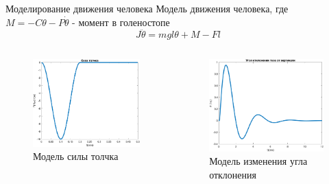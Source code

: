 \documentclass[10pt]{beamer}
\begin{document}
\begin{frame}{Моделирование движения человека}
	Модель движения человека, где $M=-C\theta-P\dot\theta$ - момент в голеностопе
		$$J\ddot{\theta}=mgl\theta+M-Fl$$
	\begin{columns}
		\begin{figure}[h!]
			\includegraphics[width=1\linewidth]{images/pushes_my_1.png}
			\caption{Модель силы толчка}
		\end{figure}
		\begin{figure}[h!]
			\includegraphics[width=1\linewidth]{images/deg_my_1.png}
			\caption{Модель изменения угла отклонения}
		\end{figure}
	\end{columns}
\end{frame}
\end{document}
